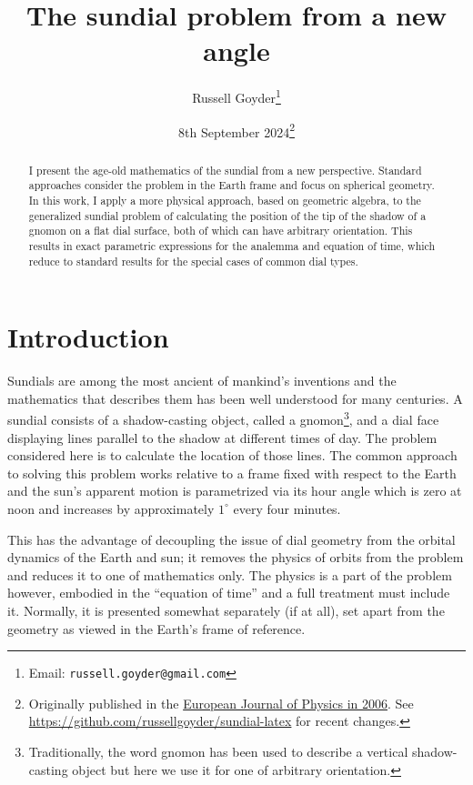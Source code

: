 \documentclass[12pt]{article}
\begin{document}
\title{The sundial problem from a new angle}
\author{Russell Goyder\footnote{Email: \texttt{russell.goyder@gmail.com}}}
\date{8th September 2024\footnote{Originally published in the \href{https://iopscience.iop.org/article/10.1088/0143-0807/27/2/023}{European Journal of Physics in 2006}. See \href{https://github.com/russellgoyder/sundial-latex}{https://github.com/russellgoyder/sundial-latex} for recent changes.}}
\maketitle

\begin{abstract}
  I present the age-old mathematics of the sundial from a new perspective. Standard approaches consider the problem in the Earth frame and focus on spherical geometry. In this work, I apply a more physical approach, based on geometric algebra, to the generalized sundial problem of calculating the position of the tip of the shadow of a gnomon on a flat dial surface, both of which can have arbitrary orientation. This results in exact parametric expressions for the analemma and equation of time, which reduce to standard results for the special cases of common dial types.
\end{abstract}

\section{Introduction}
%
Sundials are among the most ancient of mankind's inventions and the mathematics that describes them has been well understood for many centuries. A sundial consists of a shadow-casting object, called a gnomon\footnote{Traditionally, the word gnomon has been used to describe a vertical shadow-casting object but here we use it for one of arbitrary orientation.}, and a dial face displaying lines parallel to the shadow at different times of day. The problem considered here is to calculate the location of those lines. The common approach to solving this problem works relative to a frame fixed with respect to the Earth and the sun's apparent motion is parametrized via its hour angle which is zero at noon and increases by approximately $1^\circ$ every four minutes.

This has the advantage of decoupling the issue of dial geometry from the orbital dynamics of the Earth and sun; it removes the physics of orbits from the problem and reduces it to one of mathematics only. The physics is a part of the problem however, embodied in the ``equation of time'' and a full treatment must include it. Normally, it is presented somewhat separately (if at all), set apart from the geometry as viewed in the Earth's frame of reference.
\end{document}
